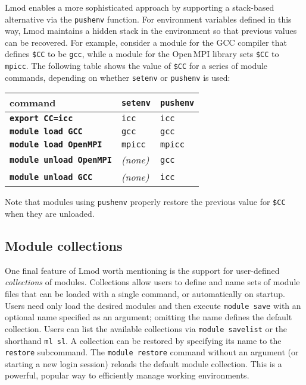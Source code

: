 Lmod enables a more sophisticated approach by supporting a stack-based
alternative via the \texttt{\small pushenv} function. For environment
variables defined in this way, Lmod maintains a hidden stack in the environment
so that previous values can be recovered.
For example, consider a module for the GCC compiler that
defines \texttt{\small \$CC} to be \texttt{\small gcc}, while a module for the
Open\,MPI library sets \texttt{\small \$CC} to
\texttt{\small mpicc}. The following table shows the value of \texttt{\small \$CC}
for a series of module commands, depending on whether \texttt{\small setenv} or
\texttt{\small pushenv} is used:
\begin{center}
 \begin{tabular}{l|l|l}
 command                                 & \texttt{\small setenv} & \texttt{\small pushenv}\\
 \hline
 \textbf{\texttt{\small export CC=icc}}  & \texttt{\small icc}  & \texttt{\small icc} \\
 \textbf{\texttt{\small module load   GCC}}   & \texttt{\small gcc}    & \texttt{\small gcc}  \\
 \textbf{\texttt{\small module load   OpenMPI}} & \texttt{\small mpicc}  & \texttt{\small mpicc} \\
 \textbf{\texttt{\small module unload OpenMPI}} & \emph{(none)}   & \texttt{\small gcc}  \\
 \textbf{\texttt{\small module unload GCC}}   & \emph{(none)}   & \texttt{\small icc} \\
  \hline
    \end{tabular}
\end{center}
\noindent
Note that modules using \texttt{\small pushenv} properly restore the previous value
for \texttt{\small\$CC} when they are unloaded.


\subsection{Module collections}

One final feature of Lmod worth mentioning is the support for user-defined
\emph{collections} of modules. Collections allow users to define and name sets of
module files that can be loaded with a single command, or automatically on startup.
Users need only load the desired modules and then execute
\texttt{\small module save} with an optional name specified as an argument;
omitting the name defines the default collection. Users can list the available
collections via \texttt{\small module savelist} or the shorthand
\texttt{\small ml sl}. A collection can be restored by specifying its name to the
\texttt{\small restore} subcommand. The \texttt{\small module restore} command
without an argument (or starting a  new login session) reloads the default module
collection. This is a powerful, popular way to efficiently manage working
environments.


